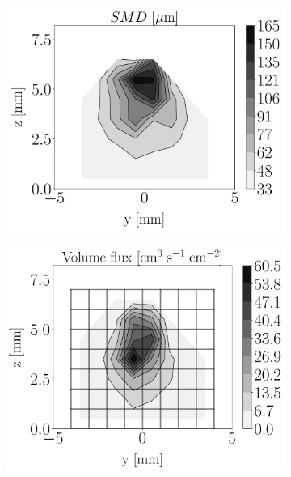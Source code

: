 \begin{figure}[h!]
\flushleft
\begin{subfigure}[b]{0.2\textwidth}
	\flushleft
	\hspace*{-0.45in}
   \includegraphics[scale=0.19]{./part2_developments/figures_ch6_lagrangian_JICF/injectors_SLI/uG100_dx10_x05_SMD_map}
\end{subfigure}
\hspace*{0.075in}
\begin{subfigure}[b]{0.2\textwidth}
	\flushleft
   \includegraphics[scale=0.19]{./part2_developments/figures_ch6_lagrangian_JICF/injectors_SLI/uG100_dx10_x05_volume_flux_map}

\end{subfigure}
\end{figure}
